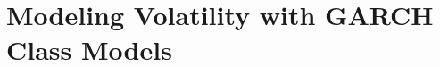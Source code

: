 \chapter{Modeling Volatility with GARCH Class Models\label{Modeling Volatility with GARCH Class Models}}